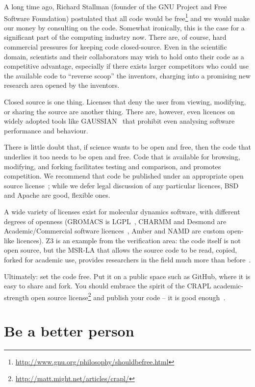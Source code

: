 \documentclass[10pt,conference,final]{IEEEtran}
\begin{document}
A long time ago, Richard Stallman (founder of the GNU Project and Free
Software Foundation) postulated that all code would be
free\footnote{\url{http://www.gnu.org/philosophy/shouldbefree.html}}
and we would make our money by consulting on the code.  Somewhat
ironically, this is the case for a significant part of the computing
industry now. There are, of course, hard commercial pressures for
keeping code closed-source. Even in the scientific domain, scientists
and their collaborators may wish to hold onto their code as a
competitive advantage, especially if there exists larger competitors
who could use the available code to ``reverse scoop'' the inventors,
charging into a promising new research area opened by the inventors.

Closed source is one thing. Licenses that deny the user from viewing,
modifying, or sharing the source are another thing. There are, however, even
licences on widely adopted tools like GAUSSIAN~\cite{Giles2004} that
prohibit even analysing software performance and behaviour.
 
There is little doubt that, if science wants to be open and free, then
the code that underlies it too needs to be open and free. Code that is
available for browsing, modifying, and forking facilitates testing and
comparison, and promotes competition. We recommend that code be
published under an appropriate open source license~\cite{osl}; while
we defer legal discussion of any particular licences, BSD and Apache
are good, flexible ones.

A wide variety of licenses exist for molecular dynamics software, with
different degrees of openness (GROMACS is LGPL~\cite{Hess2008},
CHARMM and Desmond are Academic/Commercial software
licences~\cite{Brooks2009,Bowers2006}, Amber and NAMD are custom
open-like licences). Z3 is an example from the verification area: the
code itself is not open source, but the MSR-LA that allows the source
code to be read, copied, forked for academic use, provides researchers
in the field much more than before~\cite{deMoura2012Z3open}.

Ultimately: set the code free. Put it on a public space such as GitHub, where it
is easy to share and fork. You should embrace the spirit of the CRAPL
academic-strength open source
license\footnote{\url{http://matt.might.net/articles/crapl/}} and
publish your code -- it is good enough~\cite{barnes:2010}.


\section{Be a better person}
\end{document}

